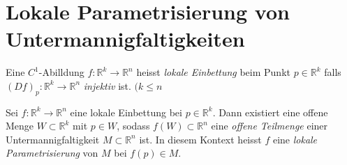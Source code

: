 \documentclass[../main.tex]{subfiles}
\begin{document}
\newpage

\section{Lokale Parametrisierung von Untermannigfaltigkeiten}
\begin{definition}
Eine $C^1$-Abilldung $f : \mathbb{R}^k \to \mathbb{R}^n$ heisst
\emph{lokale Einbettung} beim Punkt $p \in \mathbb{R}^k$ falls $(Df)_p : \mathbb{R}^k \to \mathbb{R}^n$ \emph{injektiv} ist. $(k \leq n$
\end{definition}

\begin{theorem}
Sei $f : \mathbb{R}^k \to \mathbb{R}^n$ eine lokale Einbettung bei $p \in \mathbb{R}^k$. Dann existiert eine offene Menge
$W \subset \mathbb{R}^k$ mit $p \in W$, sodass $f(W) \subset \mathbb{R}^n $ eine \emph{offene Teilmenge} einer Untermannigfaltigkeit $M \subset \mathbb{R}^n$ ist. \newline
In diesem Kontext heisst $f$ eine \emph{lokale Parametrisierung} von $M$ bei $f(p) \in M$.
\end{theorem}
\end{document}
